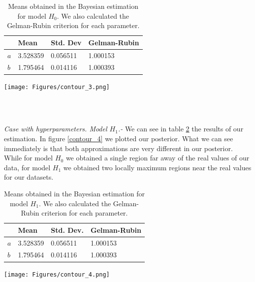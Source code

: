 \documentclass[onecolumn,           %
               showpacs,            %
               preprintnumbers,     %
               aps,                 %
               prl,          	    %
               letterpaper,             %
               superscriptaddress,      %
               nofootinbib,         %
               tightenlines,        %
               floats,floatfix      %
               ,usenatbib,
               ]{revtex4-1}
\begin{document}
\begin{table}[h!]
\centering
\begin{tabular}{||l|l|l|l||} 
 \hline
 & \textbf{Mean} & \textbf{Std. Dev} & \textbf{Gelman-Rubin} \\ [0.5ex] 
 \hline\hline
$a$ & 3.528359 	 & 0.056511 & 1.000153 \\
\hline
$b$ & 1.795464 & 0.014116 	 	 & 1.000393\\ [1ex] 
 \hline
\end{tabular}
\caption{\footnotesize{Means obtained in the Bayesian estimation for model $H_0$. We also calculated the Gelman-Rubin criterion for each parameter.}}
\label{tab2}
\end{table}

\begin{minipage}{\textwidth}
\centering
\texttt{[image: Figures/contour\_3.png]}
\label{contour_3}
\end{minipage}\\ $ $

\textit{Case with hyperparameters. Model $H_1$.-} We can see in table \ref{tab3} the results of our estimation. In figure \ref{contour_4} we plotted our posterior. What we can see immediately is that both approximations are very different in our posterior. While for model $H_0$ we obtained a single region far away of the real values of our data, for model $H_1$ we obtained two locally maximum regions near the real values for our datasets.  

\begin{table}[h!]
\centering
\begin{tabular}{||l|l|l|l||} 
 \hline
 & \textbf{Mean} & \textbf{Std. Dev.} & \textbf{Gelman-Rubin} \\ [0.5ex] 
 \hline\hline
$a$ & 3.528359 	 & 0.056511 & 1.000153 \\
\hline
$b$ & 1.795464 & 0.014116 	 	 & 1.000393\\ [1ex] 
 \hline
\end{tabular}
\caption{\footnotesize{Means obtained in the Bayesian estimation for model $H_1$. We also calculated the Gelman-Rubin criterion for each parameter.}}
\label{tab3}
\end{table}

\begin{minipage}{\textwidth}
\centering
\texttt{[image: Figures/contour\_4.png]}
\label{contour_4}
\end{minipage}\\ $ $
\end{document}
